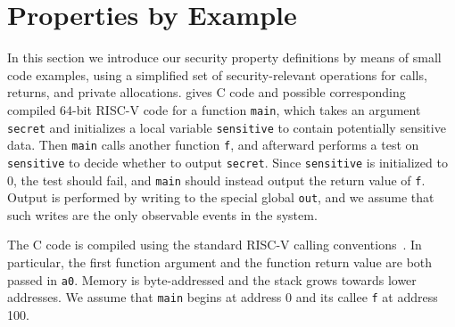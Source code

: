 \documentclass[10pt,conference]{ieeetran}%
\theoremstyle{definition}
\begin{document}

\section{Properties by Example}
\label{sec:example}

In this section we introduce our security property definitions by means
of small code examples, using a simplified set of security-relevant operations for
calls, returns, and private allocations.
 gives C code and possible corresponding compiled 64-bit RISC-V code
for a function {\tt main}, which
takes an argument {\tt secret} and initializes a local variable {\tt sensitive} to contain
potentially sensitive data.
Then {\tt main} calls another function {\tt f},
and afterward performs a test on {\tt sensitive} to decide whether
to output {\tt secret}.  Since {\tt sensitive} is initialized to 0,
the test should fail, and {\tt main} should instead output the return value of {\tt f}.
Output is performed by writing to the special global {\tt out},
and we assume that such writes are the only observable events in the system.

The C code is compiled using the standard RISC-V calling conventions~\cite{RISC-V-CC}.
In particular, the first function argument and the function
return value are both passed in {\tt a0}.
Memory is byte-addressed and the stack grows towards
lower addresses. We assume that {\tt main} begins at address 0 and its callee {\tt f} at address 100.
\end{document}
